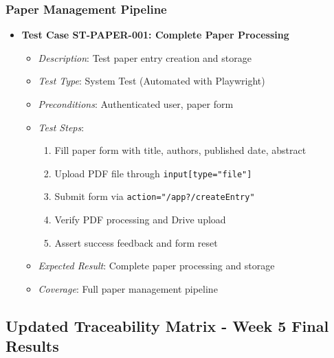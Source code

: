 \documentclass[12pt]{article}
\begin{document}
\subsubsection{Paper Management Pipeline}
\begin{itemize}
  \item \textbf{Test Case ST-PAPER-001: Complete Paper Processing}
    \begin{itemize}
      \item \textit{Description}: Test paper entry creation and storage
      \item \textit{Test Type}: System Test (Automated with Playwright)
      \item \textit{Preconditions}: Authenticated user, paper form
      \item \textit{Test Steps}:
        \begin{enumerate}
          \item Fill paper form with title, authors, published date, abstract
          \item Upload PDF file through \texttt{input[type="file"]}
          \item Submit form via \texttt{action="/app?/createEntry"}
          \item Verify PDF processing and Drive upload
          \item Assert success feedback and form reset
        \end{enumerate}
      \item \textit{Expected Result}: Complete paper processing and storage
      \item \textit{Coverage}: Full paper management pipeline
    \end{itemize}
\end{itemize}

\subsection{Updated Traceability Matrix - Week 5 Final Results}
\end{document}
